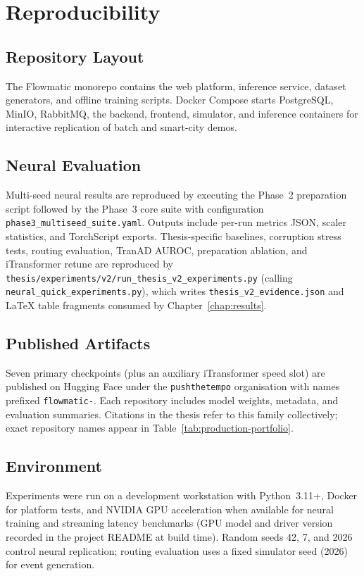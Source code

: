 \chapter{Reproducibility}
\label{app:repro}

\section{Repository Layout}

The Flowmatic monorepo contains the web platform, inference service, dataset generators, and offline training scripts. Docker Compose starts PostgreSQL, MinIO, RabbitMQ, the backend, frontend, simulator, and inference containers for interactive replication of batch and smart-city demos.

\section{Neural Evaluation}

Multi-seed neural results are reproduced by executing the Phase~2 preparation script followed by the Phase~3 core suite with configuration \texttt{phase3\_multiseed\_suite.yaml}. Outputs include per-run metrics JSON, scaler statistics, and TorchScript exports. Thesis-specific baselines, corruption stress tests, routing evaluation, TranAD AUROC, preparation ablation, and iTransformer retune are reproduced by \texttt{thesis/experiments/v2/run\_thesis\_v2\_experiments.py} (calling \texttt{neural\_quick\_experiments.py}), which writes \texttt{thesis\_v2\_evidence.json} and LaTeX table fragments consumed by Chapter~\ref{chap:results}.

\section{Published Artifacts}

Seven primary checkpoints (plus an auxiliary iTransformer speed slot) are published on Hugging Face under the \texttt{pushthetempo} organisation with names prefixed \texttt{flowmatic-}. Each repository includes model weights, metadata, and evaluation summaries. Citations in the thesis refer to this family collectively; exact repository names appear in Table~\ref{tab:production-portfolio}.

\section{Environment}

Experiments were run on a development workstation with Python~3.11+, Docker for platform tests, and NVIDIA GPU acceleration when available for neural training and streaming latency benchmarks (GPU model and driver version recorded in the project README at build time). Random seeds 42, 7, and 2026 control neural replication; routing evaluation uses a fixed simulator seed (2026) for event generation.

